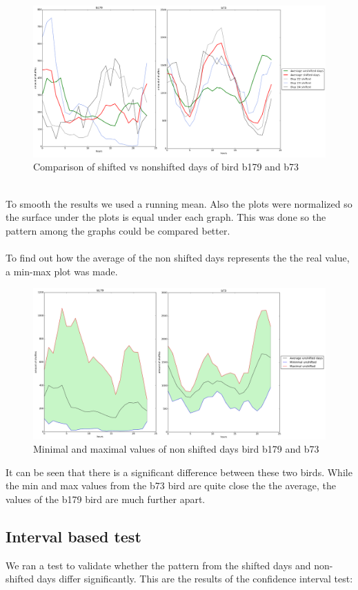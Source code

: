 \documentclass[a4paper]{article}
\begin{document}
\begin{figure}[H]
  \centering
    \includegraphics[width=1\textwidth]{b179_b73_merged}
      \caption{Comparison of shifted vs nonshifted days of bird b179 and b73}
\end{figure}
\\
To smooth the results we used a running mean. Also the plots were normalized so the surface under the plots is equal under each graph. This was done so the pattern among the graphs could be compared better.
\\ \\
To find out how the average of the non shifted days represents the the real value, a min-max plot was made.
\begin{figure}[H]
  \centering
    \includegraphics[width=1\textwidth]{b179_b73_merged_surface}
      \caption{Minimal and maximal values of non shifted days bird b179 and b73}
\end{figure}
It can be seen that there is a significant difference between these two birds. While the min and max values from the b73 bird are quite close the the average, the values of the b179 bird are much further apart.
\subsection*{Interval based test}
We ran a test to validate whether the pattern from the shifted days and non-shifted days differ significantly. This are the results of the confidence interval test:\\
\end{document}
